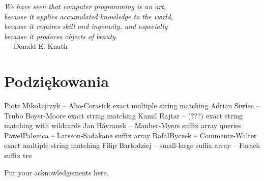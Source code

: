

\begin{flushright}{\slshape    
We have seen that computer programming is an art, \\ 
because it applies accumulated knowledge to the world, \\ 
because it requires skill and ingenuity, and especially \\
because it produces objects of beauty.} \\ \medskip
--- Donald E. Knuth
\end{flushright}

\bigskip


\begingroup

\let\clearpage\relax
\let\cleardoublepage\relax
\let\cleardoublepage\relax

\chapter*{Podziękowania}

Piotr Miko\l{}ajczyk -- Aho-Corasick exact multiple string matching
Adrian Siwiec -- Trubo Boyer-Moore exact string matching
Kamil Rajtar -- (???) exact string matching with wildcards
Jan H\'avranek -- Manber-Myers suffix array queries
Pawe\l Palenica -- Larsson-Sadakane suffix array
Rafa\l Byczek -- Commentz-Walter exact multiple string matching
Filip Bartodziej -- small-large suffix array
-- Farach suffix tre

\noindent Put your acknowledgements here.\\

\endgroup
